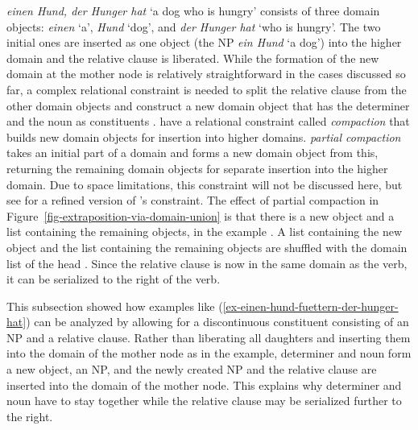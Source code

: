 \documentclass[output=paper,biblatex,babelshorthands,newtxmath,draftmode,colorlinks,citecolor=brown]{langscibook}
\begin{document}
\emph{einen Hund, der Hunger hat} `a dog who is hungry' consists of three domain objects:
\emph{einen} `a', \emph{Hund} `dog', and \emph{der Hunger hat} `who is hungry'. The two initial ones
are inserted as one object (the NP \emph{ein Hund} `a dog') into the higher domain
and the relative clause is liberated. While the formation of the new domain at the mother node is
relatively straightforward in the cases discussed so far, a complex relational constraint is needed
to split the relative clause  from the other domain objects and construct a new domain
object that has the determiner and the noun as constituents . \citeauthor{KP95a} have a relational constraint called
\textit{compaction} that builds new domain objects for insertion into higher
domains. \textit{partial compaction} takes an initial part of a domain and forms a new domain object
from this, returning the remaining domain objects for separate insertion into the higher domain. Due
to space limitations, this constraint will not be discussed here, but see  for a refined version of \citeauthor{KP95a}'s constraint. The effect of partial
compaction in Figure~\ref{fig-extraposition-via-domain-union} is that there is a new object 
and a list containing the remaining objects, in the example . A list containing
the new object  and the list containing the remaining objects  are
shuffled with the domain list of the head . Since the relative clause is now in the same domain
as the verb, it can be serialized to the right of the verb.

This subsection showed how examples like (\ref{ex-einen-hund-fuettern-der-hunger-hat}) can be
analyzed by allowing for a discontinuous constituent consisting of an NP and a relative
clause. Rather than liberating all daughters and inserting them into the domain of the mother node
as in the  example, determiner and noun form a new object, an NP, and the newly created NP
and the relative clause are inserted into the domain of the mother node. This explains why
determiner and noun have to stay together while the relative clause may be serialized further to the right.%

\end{document}
